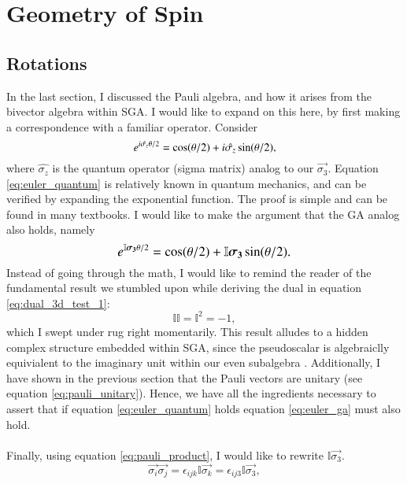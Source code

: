 

\section{Geometry of Spin}

\subsection{Rotations}
In the last section, I discussed the Pauli algebra, and how it arises from the bivector algebra within SGA. I would like to expand on this here, by first making a correspondence with a familiar operator. Consider
\begin{equation} \label{eq:euler_quantum}
	\large  \exp{i \hat{\sigma_z} \theta / 2} = \cos(\theta/2) + i \hat{\sigma_z} \sin(\theta/2),
\end{equation}
where $\hat{\sigma_z} $ is the quantum operator (sigma matrix) analog to our $\vec{\sigma_3}$. Equation \eqref{eq:euler_quantum} is relatively known in quantum mechanics, and can be verified by expanding the exponential function. The proof is simple and can be found in many textbooks. I would like to make the argument that the GA analog also holds, namely
\begin{equation} \label{eq:euler_ga}
	\large  \exp{ \mathbb{I} \vec{\sigma_3} \theta / 2} = \cos(\theta/2) + \mathbb{I} \vec{\sigma_3} \sin(\theta/2).
\end{equation}
Instead of going through the math, I would like to remind the reader of the fundamental result we stumbled upon while deriving the dual in equation \eqref{eq:dual_3d_test_1}:
\begin{equation} \label{eq:imaginary_pseudoscalar}
	\mathbb{I}  \mathbb{I} = \mathbb{I} ^2 = -1,
\end{equation}
which I swept under rug right momentarily. This result alludes to a hidden complex structure embedded within SGA, since the pseudoscalar is algebraiclly equivialent to the imaginary unit within our even subalgebra \cite{dressel_spacetime_2015}. Additionally, I have shown in the previous section that the Pauli vectors are unitary (see equation \eqref{eq:pauli_unitary}). Hence, we have all the ingredients necessary to assert that if equation \eqref{eq:euler_quantum} holds equation \eqref{eq:euler_ga} must also hold.
\\ \\
Finally, using equation \eqref{eq:pauli_product}, I would like to rewrite  $\mathbb{I} \vec{\sigma_3}$.
$$ \vec{\sigma_i} \vec{\sigma_j} = \epsilon_{ijk} \mathbb{I} \vec{\sigma_k} = \epsilon_{ij3} \mathbb{I} \vec{\sigma_3},$$

